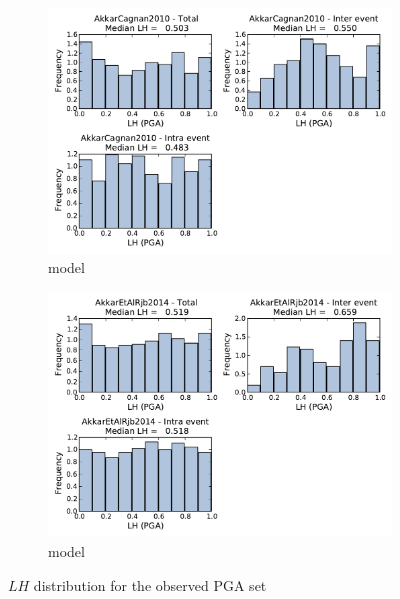 \begin{figure}[htb]
\begin{subfigure}[b]{0.49\textwidth}
      \includegraphics[width=\textwidth]{./figures/residuals/AC2010_LH_PGA.pdf}
      \caption{\cite{AkkarCagnan2010} model}
      \label{fig:pga_lh_ac2010}
  \end{subfigure}
      \begin{subfigure}[b]{0.49\textwidth}
      \includegraphics[width=\textwidth]{./figures/residuals/Akkar2014_LH_PGA.pdf}
     \caption{\cite{Akkar_etal2014} model}
      \label{fig:pga_lh_akkar2014}
  \end{subfigure}
  \caption{$LH$ distribution for the observed PGA set}
  \label{fig:pga_lh}
\end{figure}

